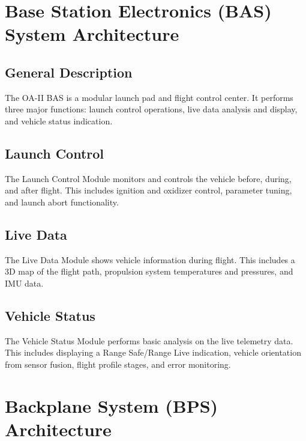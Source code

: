 \documentclass[12pt,article]{memoir}
\begin{document}
\newpage

\chapter{Base Station Electronics (BAS) System Architecture}
\section{General Description}
The OA-II BAS is a modular launch pad and flight control center. It performs three major functions: launch control operations, live data analysis and display, and vehicle status indication.
\section{Launch Control}
The Launch Control Module monitors and controls the vehicle before, during, and after flight. This includes ignition and oxidizer control, parameter tuning, and launch abort functionality.
\section{Live Data}
The Live Data Module shows vehicle information during flight. This includes a 3D map of the flight path, propulsion system temperatures and pressures, and IMU data.
\section{Vehicle Status}
The Vehicle Status Module performs basic analysis on the live telemetry data. This includes displaying a Range Safe/Range Live indication, vehicle orientation from sensor fusion, flight profile stages, and error monitoring.

\newpage

\chapter{Backplane System (BPS) Architecture}
\end{document}
